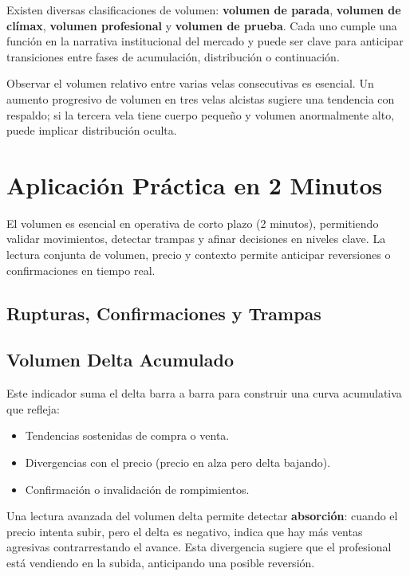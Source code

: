 Existen diversas clasificaciones de volumen: \textbf{volumen de parada}, \textbf{volumen de cl\'imax}, \textbf{volumen profesional} y \textbf{volumen de prueba}. Cada uno cumple una funci\'on en la narrativa institucional del mercado y puede ser clave para anticipar transiciones entre fases de acumulaci\'on, distribuci\'on o continuaci\'on.

Observar el volumen relativo entre varias velas consecutivas es esencial. Un aumento progresivo de volumen en tres velas alcistas sugiere una tendencia con respaldo; si la tercera vela tiene cuerpo peque\~no y volumen anormalmente alto, puede implicar distribuci\'on oculta.

\section{Aplicaci\'on Pr\'actica en 2 Minutos}

El volumen es esencial en operativa de corto plazo (2 minutos), permitiendo validar movimientos, detectar trampas y afinar decisiones en niveles clave. La lectura conjunta de volumen, precio y contexto permite anticipar reversiones o confirmaciones en tiempo real.

\subsection{Rupturas, Confirmaciones y Trampas}



\subsection{Volumen Delta Acumulado}

Este indicador suma el delta barra a barra para construir una curva acumulativa que refleja:
\begin{itemize}
  \item Tendencias sostenidas de compra o venta.
  \item Divergencias con el precio (precio en alza pero delta bajando).
  \item Confirmaci\'on o invalidaci\'on de rompimientos.
\end{itemize}

Una lectura avanzada del volumen delta permite detectar \textbf{absorci\'on}: cuando el precio intenta subir, pero el delta es negativo, indica que hay m\'as ventas agresivas contrarrestando el avance. Esta divergencia sugiere que el profesional est\'a vendiendo en la subida, anticipando una posible reversi\'on.

